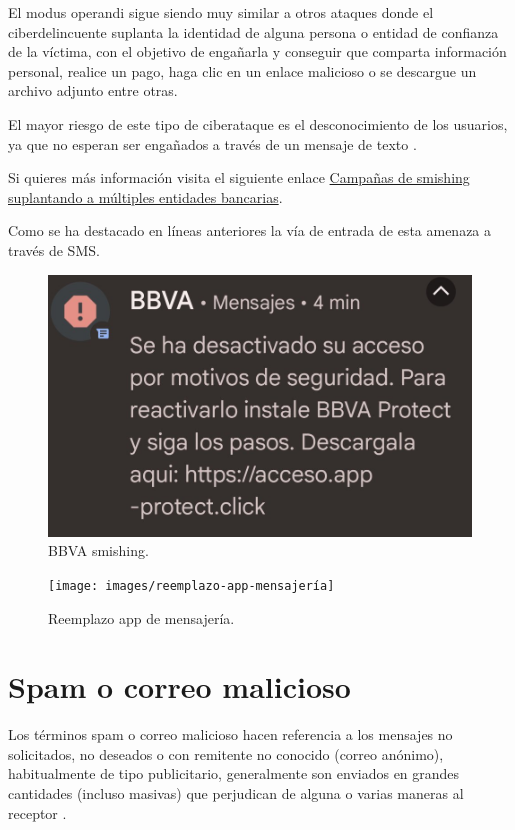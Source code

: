 \documentclass[
  a4paper,
  openany]{book}
\begin{document}
El modus operandi sigue siendo muy similar a otros ataques donde el ciberdelincuente suplanta la identidad de alguna persona o entidad de confianza de la víctima, con el objetivo de engañarla y conseguir que comparta información personal, realice un pago, haga clic en un enlace malicioso o se descargue un archivo adjunto entre otras.

El mayor riesgo de este tipo de ciberataque es el desconocimiento de los usuarios, ya que no esperan ser engañados a través de un mensaje de texto \citep{INCI-smishing}.

Si quieres más información visita el siguiente enlace \href{https://www.incibe.es/protege-tu-empresa/avisos-seguridad/campanas-smishing-suplantando-multiples-entidades-bancarias}{Campañas de smishing suplantando a múltiples entidades bancarias}.

Como se ha destacado en líneas anteriores la vía de entrada de esta amenaza a través de SMS.

\begin{figure}

{\centering \includegraphics[width=0.35\linewidth]{images/bbva-smishing} 

}

\caption{BBVA smishing.}\label{fig:unnamed-chunk-18}
\end{figure}

\begin{figure}

{\centering \texttt{[image: images/reemplazo-app-mensajería]} 

}

\caption{Reemplazo app de mensajería.}\label{fig:unnamed-chunk-19}
\end{figure}

\hypertarget{spam-o-correo-malicioso}{%
\section{Spam o correo malicioso}\label{spam-o-correo-malicioso}}

Los términos spam o correo malicioso hacen referencia a los mensajes no solicitados, no deseados o con remitente no conocido (correo anónimo), habitualmente de tipo publicitario, generalmente son enviados en grandes cantidades (incluso masivas) que perjudican de alguna o varias maneras al receptor \citep{WIKI-spam}.
\end{document}
